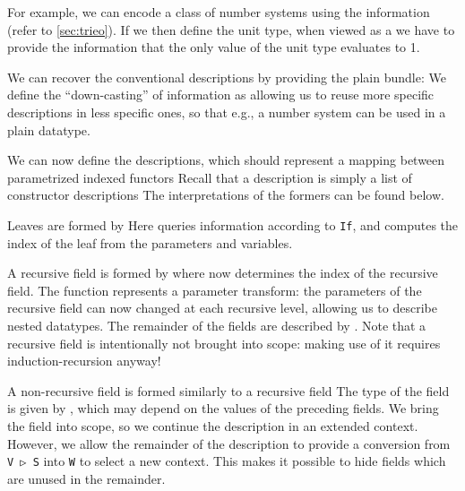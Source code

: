 \begin{example}
    For example, we can encode a class of number systems using the information 
    (refer to \autoref{sec:trieo}). If we then define the unit type, when viewed as a 
    we have to provide the information that the only value of the unit type evaluates to 1.
\end{example}

We can recover the conventional descriptions by providing the plain bundle:
We define the ``down-casting'' of information as
allowing us to reuse more specific descriptions in less specific ones, so that e.g., a number system can be used in a plain datatype.

We can now define the descriptions, which should represent a mapping between parametrized indexed functors
Recall that a description 
is simply a list of constructor descriptions
The interpretations \hyperlink{desc-desc-interpretation}{} of the formers can be found below.

Leaves are formed by
Here  queries information according to \texttt{If}, and  computes the index of the leaf from the parameters and variables.

A recursive field is formed by
where  now determines the index of the recursive field. The function  represents a parameter transform: the parameters of the recursive field can now changed at each recursive level, allowing us to describe nested datatypes. The remainder of the fields are described by . Note that a recursive field is intentionally not brought into scope: making use of it requires induction-recursion anyway!

A non-recursive field is formed similarly to a recursive field
The type of the field is given by , which may depend on the values of the preceding fields. We bring the field into scope, so we continue the description in an extended context. However, we allow the remainder of the description to provide a conversion from \texttt{V ▷ S} into \texttt{W} to select a new context. This makes it possible to hide fields which are unused in the remainder.

